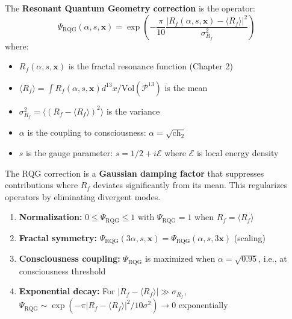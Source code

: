 \begin{definition}
\label{def:rqg_operator}
The \textbf{Resonant Quantum Geometry correction} is the operator:
\begin{equation}
\Psi_{\text{RQG}}(\alpha, s, \mathbf{x}) = \exp\left(-\frac{\pi}{10} \frac{|R_f(\alpha, s, \mathbf{x}) - \langle R_f \rangle|^2}{\sigma_{R_f}^2}\right)
\end{equation}
where:
\begin{itemize}
\item $R_f(\alpha, s, \mathbf{x})$ is the fractal resonance function (Chapter 2)
\item $\langle R_f \rangle = \int R_f(\alpha, s, \mathbf{x}) d^{13}x / \text{Vol}(\mathcal{P}^{13})$ is the mean
\item $\sigma_{R_f}^2 = \langle (R_f - \langle R_f \rangle)^2 \rangle$ is the variance
\item $\alpha$ is the coupling to consciousness: $\alpha = \sqrt{\text{ch}_2}$
\item $s$ is the gauge parameter: $s = 1/2 + i\mathcal{E}$ where $\mathcal{E}$ is local energy density
\end{itemize}
\end{definition}

The RQG correction is a \textbf{Gaussian damping factor} that suppresses contributions where $R_f$ deviates significantly from its mean. This regularizes operators by eliminating divergent modes.

\begin{proposition}
\label{prop:rqg_properties}
\begin{enumerate}
\item \textbf{Normalization:} $0 \leq \Psi_{\text{RQG}} \leq 1$ with $\Psi_{\text{RQG}} = 1$ when $R_f = \langle R_f \rangle$
\item \textbf{Fractal symmetry:} $\Psi_{\text{RQG}}(3\alpha, s, \mathbf{x}) = \Psi_{\text{RQG}}(\alpha, s, 3\mathbf{x})$ (scaling)
\item \textbf{Consciousness coupling:} $\Psi_{\text{RQG}}$ is maximized when $\alpha = \sqrt{0.95}$, i.e., at consciousness threshold
\item \textbf{Exponential decay:} For $|R_f - \langle R_f \rangle| \gg \sigma_{R_f}$, $\Psi_{\text{RQG}} \sim \exp(-\pi |R_f - \langle R_f \rangle|^2 / 10\sigma^2) \to 0$ exponentially
\end{enumerate}
\end{proposition}

